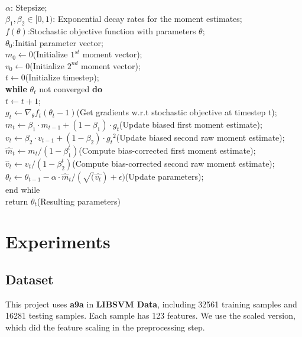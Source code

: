 \documentclass[journal, a4paper]{IEEEtran}
\begin{document}
\begin{algorithm}[htb]
\caption{}
\label{alg:Framwork}
\begin{algorithmic}
\REQUIRE ~~\\
$\alpha$: Stepsize;\\
$\beta_1, \beta_2 \in [0,1)$: Exponential decay rates for the moment estimates;\\
$f(\theta)$:Stochastic objective function with parameters $\theta$;\\
$\theta_0$:Initial parameter vector;\\

$m_0 \leftarrow 0$(Initialize $1^{st}$ moment vector);\\
$v_0 \leftarrow 0$(Initialize $2^{nd}$ moment vector);\\
$t \leftarrow 0$(Initialize timestep);\\
\textbf{while} $\theta_t$ not converged \textbf{do} \\
$t \leftarrow t+1$;\\
$g_t \leftarrow \nabla_\theta f_{t}(\theta_t-1)$(Get gradients w.r.t stochastic objective at timestep t);\\
$m_t \leftarrow \beta_1 \cdot m_{t-1} + (1-\beta_1) \cdot g_t$(Update biased first moment estimate);\\
$v_t \leftarrow \beta_2 \cdot v_{t-1} + (1-\beta_2) \cdot {g_t}^2$(Update biased second raw moment estimate);\\
$\hat{m}_t \leftarrow m_t/(1-\beta_{1}^{t})$(Compute bias-corrected first moment estimate);\\
$\hat{v}_t \leftarrow v_t/(1-\beta_{2}^t)$(Compute bias-corrected second raw moment estimate);\\
$\theta_t \leftarrow \theta_{t-1} - \alpha \cdot \hat{m}_t/(\sqrt(\hat{v_t}) + \epsilon)$(Update parameters);\\
end while\\
return $\theta_t$(Resulting parameters)
\end{algorithmic}
\end{algorithm}

\section{Experiments}
\subsection{Dataset}
 This project uses \textbf{a9a} in \textbf{LIBSVM Data}, including 32561 training samples and 16281 testing samples. Each sample has 123 features. We use the scaled version, which did the feature scaling in the preprocessing step.
\end{document}
